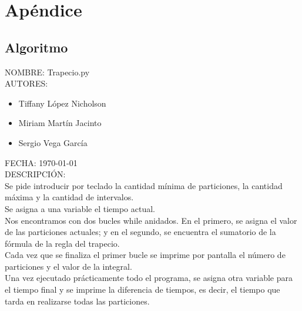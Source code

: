 \documentclass{article}
\begin{document}
   \pagebreak

   \section{Apéndice}
    \subsection{Algoritmo}
   NOMBRE: Trapecio.py\\
   
   AUTORES:

   \begin{itemize}
     \item Tiffany López Nicholson
     \item Miriam Martín Jacinto
     \item Sergio Vega García
   \end{itemize}

   FECHA: \today \\

   DESCRIPCIÓN:\\

     Se pide introducir por teclado la cantidad mínima de particiones, la cantidad máxima y la cantidad de intervalos.\\
	
	Se asigna a una variable el tiempo actual.\\

	Nos encontramos con dos bucles while anidados. En el primero, se asigna el valor de las particiones actuales; y en el segundo, se encuentra el sumatorio de la fórmula de la regla del trapecio.\\

     Cada vez que se finaliza el primer bucle se imprime por pantalla el número de particiones y el valor de la integral.\\

	Una vez ejecutado prácticamente todo el programa, se asigna otra variable para el tiempo final y se imprime la diferencia de tiempos, es decir, el tiempo que tarda en realizarse todas las particiones.\\

  \pagebreak

\end{document}
